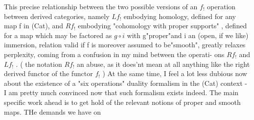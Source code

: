 This precise relationship between the two possible versions of
an $f_{!}$ operation  between derived categories, namely $Lf_{!}$
embodying homology, defined for any map f in (Cat), and $Rf_{!}$ embodying
"cohomology with proper supports" , defined for a map which may be
factored as $g\circ i$ with g\hand{/}"proper"and i an (open, if we like) immersion,
relation valid if f is moreover assumed to be"smooth", greatly relaxes
 perplexity, coming from a confusion in my mind between the operati-%
ons $Rf_{!}$ and $Lf_{!}$ . ( the notation $Rf_{!}$  an abuse, as
 it does'nt mean at all anything like the  right derived functor
of the functor $f_{!}$ \hand{!}) At the same time, I feel a lot less dubious now
about the existence of a  "six operations" duality formalism in
the (Cat) context - I am pretty much convinced now that such formalism
exists indeed. The main specific work ahead is to get hold of the
relevant notions of proper and smooth maps. THe demands we have on

